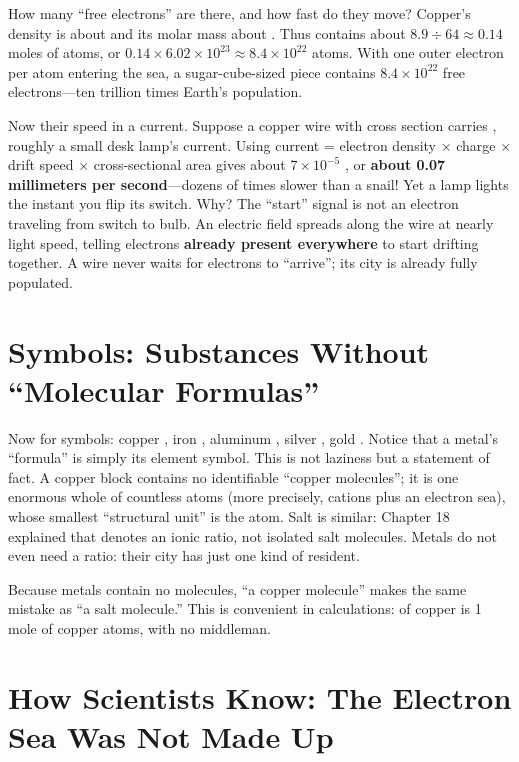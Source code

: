 \begin{qiaoliang}
How many ``free electrons'' are there, and how fast do they move? Copper's density is about  and its molar mass about . Thus  contains about $8.9\div 64\approx 0.14$ moles of atoms, or $0.14\times 6.02\times 10^{23}\approx 8.4\times 10^{22}$ atoms. With one outer electron per atom entering the sea, a sugar-cube-sized piece contains $8.4\times 10^{22}$ free electrons---ten trillion times Earth's population.

Now their speed in a current. Suppose a copper wire with cross section  carries , roughly a small desk lamp's current. Using current = electron density × charge × drift speed × cross-sectional area gives about $7\times 10^{-5}$ , or \textbf{about 0.07 millimeters per second}---dozens of times slower than a snail! Yet a lamp lights the instant you flip its switch. Why? The ``start'' signal is not an electron traveling from switch to bulb. An electric field spreads along the wire at nearly light speed, telling electrons \textbf{already present everywhere} to start drifting together. A wire never waits for electrons to ``arrive''; its city is already fully populated.
\end{qiaoliang}

\section{Symbols: Substances Without ``Molecular Formulas''}

Now for symbols: copper , iron , aluminum , silver , gold . Notice that a metal's ``formula'' is simply its element symbol. This is not laziness but a statement of fact. A copper block contains no identifiable ``copper molecules''; it is one enormous whole of countless  atoms (more precisely,  cations plus an electron sea), whose smallest ``structural unit'' is the atom. Salt is similar: Chapter 18 explained that  denotes an ionic ratio, not isolated salt molecules. Metals do not even need a ratio: their city has just one kind of resident.

Because metals contain no molecules, ``a copper molecule'' makes the same mistake as ``a salt molecule.'' This is convenient in calculations:  of copper is 1 mole of copper atoms, with no middleman.

\section{How Scientists Know: The Electron Sea Was Not Made Up}

